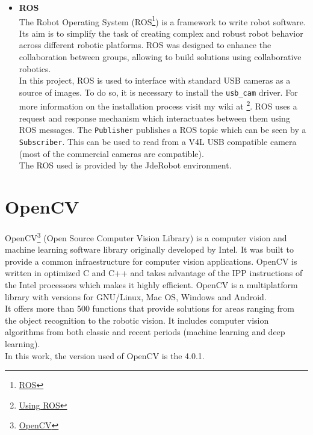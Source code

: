 \begin{itemize}
    \item \textbf{ROS}\\
The Robot Operating System (ROS\footnote {\href{https://www.ros.org/}{ROS}}) is a framework to write robot software. Its aim is to simplify the task of creating complex and robust robot behavior across different robotic platforms. ROS was designed to enhance the collaboration between groups, allowing to build solutions using collaborative robotics.\\
In this project, ROS is used to interface with standard USB cameras as a source of images. To do so, it is necessary to install the \texttt{usb\_cam} driver. For more information on the installation process visit my wiki at \footnote {\label{using_ros}\href{https://jderobot.org/Arodriguez-tfm\#Week_24:_Introducing_ROS}{Using ROS}}. ROS uses a request and response mechanism which interactuates between them using ROS messages. The \texttt{Publisher} publishes a ROS topic which can be seen by a \texttt{Subscriber}. This can be used to read from a V4L USB compatible camera (most of the commercial cameras are compatible).\\
The ROS used is provided by the JdeRobot environment.
\end{itemize}
\section{OpenCV}
OpenCV\footnote {\href{https://opencv.org/}{OpenCV}} (Open Source Computer Vision Library) is a computer vision and machine learning software library originally developed by Intel. It was built to provide a common infraestructure for computer vision applications. OpenCV is written in optimized C and C++ and takes advantage of the IPP instructions of the Intel processors which makes it highly efficient. OpenCV is a multiplatform library with versions for GNU/Linux, Mac OS, Windows and Android.\\ It offers more than 500 functions that provide solutions for areas ranging from the object recognition to the robotic vision. It includes computer vision algorithms from both classic and recent periods (machine learning and deep learning).\\
In this work, the version used of OpenCV is the 4.0.1.

